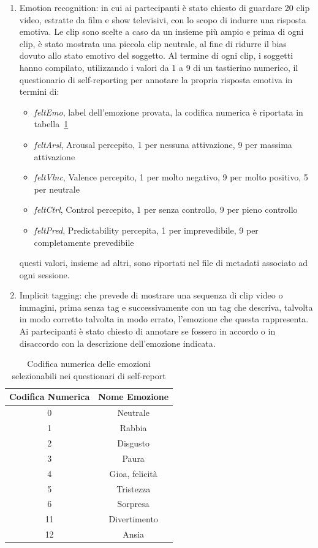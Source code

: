 \begin{enumerate}
    \item Emotion recognition: in cui ai partecipanti è stato chiesto di guardare 20 clip video, estratte da film e show televisivi, con lo scopo di indurre una risposta emotiva. Le clip sono scelte a caso da un insieme più ampio e prima di ogni clip, è stato mostrata una piccola clip neutrale, al fine di ridurre il bias dovuto allo stato emotivo del soggetto.
    Al termine di ogni clip, i soggetti hanno compilato, utilizzando i valori da 1 a 9 di un tastierino numerico, il questionario di self-reporting per annotare la propria risposta emotiva in termini di:
    \begin{itemize}
        \item \textit{feltEmo}, label dell'emozione provata, la codifica numerica è riportata in tabella~\ref{tab:emotions_map}
        \item \textit{feltArsl}, Arousal percepito, 1 per nessuna attivazione, 9 per massima attivazione
        \item \textit{feltVlnc}, Valence percepito, 1 per molto negativo, 9 per molto positivo, 5 per neutrale
        \item \textit{feltCtrl}, Control percepito, 1 per senza controllo, 9 per pieno controllo
        \item \textit{feltPred}, Predictability percepita, 1 per imprevedibile, 9 per completamente prevedibile
    \end{itemize}
    questi valori, insieme ad altri, sono riportati nel file di metadati associato ad ogni sessione.

    \item Implicit tagging: che prevede di mostrare una sequenza di clip video o immagini, prima senza tag e successivamente con un tag che descriva, talvolta in modo corretto talvolta in modo errato, l'emozione che questa rappresenta. Ai partecipanti è stato chiesto di annotare se fossero in accordo o in disaccordo con la descrizione dell'emozione indicata.
\end{enumerate}

\begin{table}[]
\begin{tabular}{c|c}
Codifica Numerica & Nome Emozione \\
\hline
0                 & Neutrale \\
1                 & Rabbia \\
2                 & Disgusto \\
3                 & Paura \\
4                 & Gioa, felicità \\
5                 & Tristezza \\
6                 & Sorpresa \\
11                & Divertimento \\
12                & Ansia \\
\end{tabular}
\caption{Codifica numerica delle emozioni selezionabili nei questionari di self-report}
\label{tab:emotions_map}
\end{table}

